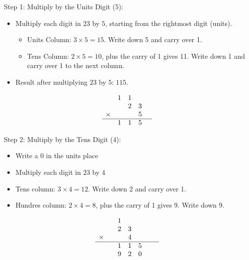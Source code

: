 \vspace{\baselineskip}\par
Step 1: Multiply by the Units Digit (5):
  \begin{itemize}
   \item Multiply each digit in \( 23 \) by \( 5 \), starting from the rightmost digit (units).
    \begin{itemize}
      \item Units Column: \( 3 \times 5 = 15 \). Write down 5 and carry over 1.
   \item Tens Column: \( 2 \times 5 = 10 \), plus the carry of 1 gives 11. Write down 1 and carry over 1 to the next column.
   \end{itemize}
   \item Result after multiplying \( 23 \) by \( 5 \): \( 115 \).

\end{itemize}
\[
\begin{array}{rccccc}
   & 1 & 1 &  &  \\ %
   & & 2 & 3 \\ %
  \times & & & 5 \\ %
  \hline
  & 1 & 1 & 5 &  \\ %
\end{array}
\]

\vspace{\baselineskip}\par
Step 2: Multiply by the Tens Digit (4):
  \begin{itemize}
  \item Write a 0 in the units place
   \item Multiply each digit in \( 23 \) by \( 4 \)
   \item Tens column: \( 3 \times 4 = 12 \). Write down 2 and carry over 1.
   \item Hundres column: \( 2 \times 4 = 8 \), plus the carry of 1 gives 9. Write down 9.
  \end{itemize}

\[
\begin{array}{rcccccc}
         &  & 1 &   &   & & \\ %
         &  & 2 & 3 &   & &\\ 
  \times &  &   & 4 &   & &\\ 
  \hline
        &   & 1 & 1 & 5 & & \\ 
        &   & 9 & 2 & 0 &
\end{array}
\]

